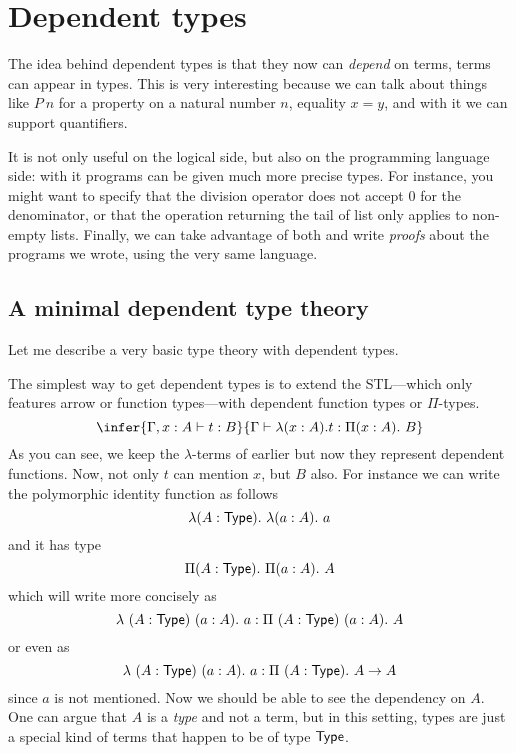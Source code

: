 \chapter{Dependent types}

The idea behind dependent types is that they now can \emph{depend} on terms,
\ie terms can appear in types. This is very interesting because we can talk
about things like \(P\ n\) for a property on a natural number \(n\),
equality \(x = y\), and with it we can support quantifiers.

It is not only useful on the logical side, but also on the programming language
side: with it programs can be given much more precise types.
For instance, you might want to specify that the division operator does not
accept \(0\) for the denominator, or that the operation returning the tail of
list only applies to non-empty lists.
Finally, we can take advantage of both and write \emph{proofs} about the
programs we wrote, using the very same language.

\section{A minimal dependent type theory}

Let me describe a very basic type theory with dependent types.


The simplest way to get dependent types is to extend the \acrshort{STL}---which
only features arrow or function types---with dependent function types or
\(\Pi\)-types.
\[
  \infer
    {\Ga, x :A \vdash t : B}
    {\Ga \vdash \lambda (x:A).t : \Pi (x:A).\ B}
\]
As you can see, we keep the \(\lambda\)-terms of earlier but now they represent
dependent functions. Now, not only \(t\) can mention \(x\), but \(B\) also.
For instance we can write the polymorphic identity function as follows
\[
  \lambda (A : \mathsf{Type}).\ \lambda (a : A).\ a
\]
and it has type
\[
  \Pi (A : \mathsf{Type}).\ \Pi (a : A).\ A
\]
which will write more concisely as
\[
  \lambda\ (A : \mathsf{Type})\ (a : A).\ a
  : \Pi\ (A : \mathsf{Type})\ (a : A).\ A
\]
or even as
\[
  \lambda\ (A : \mathsf{Type})\ (a : A).\ a
  : \Pi\ (A : \mathsf{Type}).\ A \to A
\]
since \(a\) is not mentioned.
Now we should be able to see the dependency on \(A\).
One can argue that \(A\) is a \emph{type} and not a term, but in this setting,
types are just a special kind of terms that happen to be of type \(\mathsf{Type}\).

